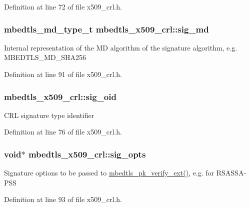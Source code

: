 Definition at line 72 of file x509\-\_\-crl.\-h.

\hypertarget{structmbedtls__x509__crl_a85c03124f3b4a2afe8b5c47fab13a8a9}{
\subsubsection[{sig\-\_\-md}]{\setlength{\rightskip}{0pt plus 5cm}mbedtls\-\_\-md\-\_\-type\-\_\-t mbedtls\-\_\-x509\-\_\-crl\-::sig\-\_\-md}}\label{structmbedtls__x509__crl_a85c03124f3b4a2afe8b5c47fab13a8a9}
Internal representation of the M\-D algorithm of the signature algorithm, e.\-g. M\-B\-E\-D\-T\-L\-S\-\_\-\-M\-D\-\_\-\-S\-H\-A256 

Definition at line 91 of file x509\-\_\-crl.\-h.

\hypertarget{structmbedtls__x509__crl_ad21b69052f214be907ceb84a9274b9f2}{
\subsubsection[{sig\-\_\-oid}]{ mbedtls\-\_\-x509\-\_\-crl\-::sig\-\_\-oid}}\label{structmbedtls__x509__crl_ad21b69052f214be907ceb84a9274b9f2}
C\-R\-L signature type identifier 

Definition at line 76 of file x509\-\_\-crl.\-h.

\hypertarget{structmbedtls__x509__crl_ad59e3744b290f19d6400678d364aef77}{
\subsubsection[{sig\-\_\-opts}]{\setlength{\rightskip}{0pt plus 5cm}void$\ast$ mbedtls\-\_\-x509\-\_\-crl\-::sig\-\_\-opts}}\label{structmbedtls__x509__crl_ad59e3744b290f19d6400678d364aef77}
Signature options to be passed to \hyperlink{pk_8h_a81f0c5e40b839f5eca676c2c2752036f}{mbedtls\-\_\-pk\-\_\-verify\-\_\-ext()}, e.\-g. for R\-S\-A\-S\-S\-A-\/\-P\-S\-S 

Definition at line 93 of file x509\-\_\-crl.\-h.

